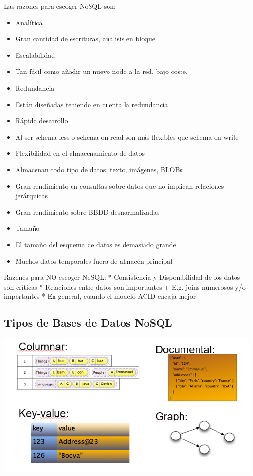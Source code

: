 \documentclass[
]{book}
\providecommand{\tightlist}{%
  \setlength{\itemsep}{0pt}\setlength{\parskip}{0pt}}
\begin{document}
Las razones para escoger NoSQL son:

\begin{itemize}
\tightlist
\item
  Analítica
\item
  Gran cantidad de escrituras, análisis en bloque
\item
  Escalabilidad
\item
  Tan fácil como añadir un nuevo nodo a la red, bajo coste.
\item
  Redundancia
\item
  Están diseñadas teniendo en cuenta la redundancia
\item
  Rápido desarrollo
\item
  Al ser schema-less o schema on-read son más flexibles que schema on-write
\item
  Flexibilidad en el almacenamiento de datos
\item
  Almacenan todo tipo de datos: texto, imágenes, BLOBs
\item
  Gran rendimiento en consultas sobre datos que no implican relaciones jerárquicas
\item
  Gran rendimiento sobre BBDD desnormalizadas
\item
  Tamaño
\item
  El tamaño del esquema de datos es demasiado grande
\item
  Muchos datos temporales fuera de almacén principal
\end{itemize}

Razones para NO escoger NoSQL:
* Consistencia y Disponibilidad de los datos son críticas
* Relaciones entre datos son importantes
+ E.g. joins numerosos y/o importantes
* En general, cuando el modelo ACID encaja mejor

\hypertarget{tipos-de-bases-de-datos-nosql}{%
\subsection{Tipos de Bases de Datos NoSQL}\label{tipos-de-bases-de-datos-nosql}}

\includegraphics{images/TiposBBDDNoSQL.png}
\end{document}
